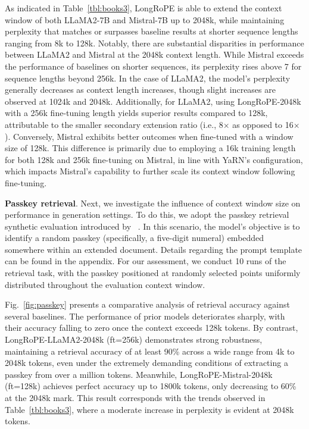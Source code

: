 As indicated in Table~\ref{tbl:books3}, LongRoPE is able to extend the context window of both LLaMA2-7B and Mistral-7B up to 2048k, while maintaining perplexity that matches or surpasses baseline results at shorter sequence lengths ranging from 8k to 128k. Notably, there are substantial disparities in performance between LLaMA2 and Mistral at the 2048k context length. While Mistral exceeds the performance of baselines on shorter sequences, its perplexity rises above 7 for sequence lengths beyond 256k. In the case of LLaMA2, the model’s perplexity generally decreases as context length increases, though slight increases are observed at 1024k and 2048k. Additionally, for LLaMA2, using LongRoPE-2048k with a 256k fine-tuning length yields superior results compared to 128k, attributable to the smaller secondary extension ratio (i.e., 8$\times$ as opposed to 16$\times$). Conversely, Mistral exhibits better outcomes when fine-tuned with a window size of 128k. This difference is primarily due to employing a 16k training length for both 128k and 256k fine-tuning on Mistral, in line with YaRN’s configuration, which impacts Mistral's capability to further scale its context window following fine-tuning.

\textbf{Passkey retrieval}. Next, we investigate the influence of context window size on performance in generation settings. To do this, we adopt the passkey retrieval synthetic evaluation introduced by ~\cite{passkey}. In this scenario, the model's objective is to identify a random passkey (specifically, a five-digit numeral) embedded somewhere within an extended document. Details regarding the prompt template can be found in the appendix. For our assessment, we conduct 10 runs of the retrieval task, with the passkey positioned at randomly selected points uniformly distributed throughout the evaluation context window.

Fig.~\ref{fig:passkey} presents a comparative analysis of retrieval accuracy against several baselines. The performance of prior models deteriorates sharply, with their accuracy falling to zero once the context exceeds 128k tokens. By contrast, LongRoPE-LLaMA2-2048k (ft=256k) demonstrates strong robustness, maintaining a retrieval accuracy of at least 90\% across a wide range from 4k to 2048k tokens, even under the extremely demanding conditions of extracting a passkey from over a million tokens. Meanwhile, LongRoPE-Mistral-2048k (ft=128k) achieves perfect accuracy up to 1800k tokens, only decreasing to 60\% at the 2048k mark. This result corresponds with the trends observed in Table~\ref{tbl:books3}, where a moderate increase in perplexity is evident at 2048k tokens.

